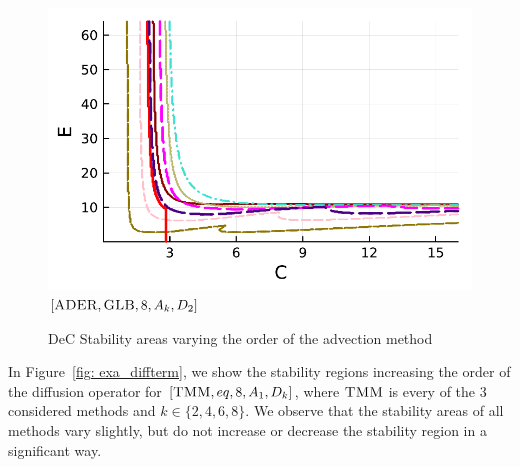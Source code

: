 \begin{figure}[!h]
	\begin{minipage}[t]{0.32\textwidth}
		\includegraphics[width=\textwidth]{pdf/pdepics/diff/IMEXADER_gaussLobatto_adv_ord_1-8.pdf}
		\centering
		$[\textsc{ADER},\textsc{GLB},8, A_k,D_2]$
	\end{minipage}
	\caption{DeC Stability areas varying the order of the advection method}
	\label{fig: exa_advterm}
\end{figure}


In Figure~\ref{fig: exa_diffterm}, we show the stability regions increasing the order of the diffusion operator for $[\textsc{TMM},eq, 8, A_1,D_k]$, where $\textsc{TMM}$ is every of the 3 considered methods and $k \in \{2,4,6,8\}$.  We observe that the stability areas of all methods vary slightly, but do not increase or decrease the stability region in a significant way.

